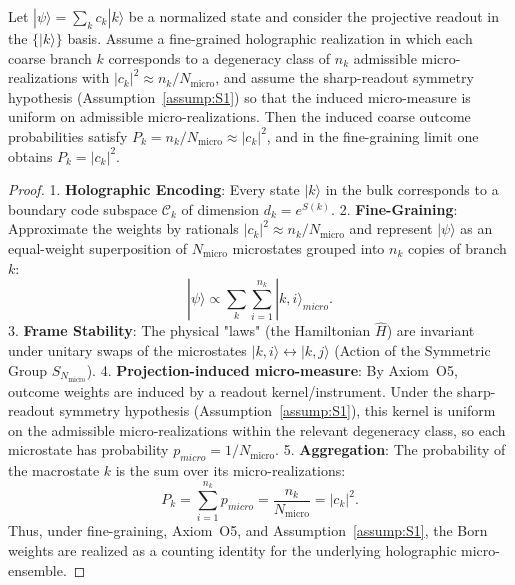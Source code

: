 \begin{theorem}
\label{thm:born_rule}
Let $|\psi\rangle = \sum_k c_k |k\rangle$ be a normalized state and consider the projective readout in the $\{|k\rangle\}$ basis. Assume a fine-grained holographic realization in which each coarse branch $k$ corresponds to a degeneracy class of $n_k$ admissible micro-realizations with $|c_k|^2\approx n_k/N_{\mathrm{micro}}$, and assume the sharp-readout symmetry hypothesis (Assumption~\ref{assump:S1}) so that the induced micro-measure is uniform on admissible micro-realizations. Then the induced coarse outcome probabilities satisfy $P_k=n_k/N_{\mathrm{micro}}\approx |c_k|^2$, and in the fine-graining limit one obtains $P_k=|c_k|^2$.
\end{theorem}
\begin{proof}
1. \textbf{Holographic Encoding}: Every state $|k\rangle$ in the bulk corresponds to a boundary code subspace $\mathcal{C}_k$ of dimension $d_k = e^{S(k)}$.
2. \textbf{Fine-Graining}: Approximate the weights by rationals $|c_k|^2 \approx n_k/N_{\mathrm{micro}}$ and represent $|\psi\rangle$ as an equal-weight superposition of $N_{\mathrm{micro}}$ microstates grouped into $n_k$ copies of branch $k$:
\begin{equation}
|\psi\rangle \propto \sum_{k} \sum_{i=1}^{n_k} |k, i\rangle_{micro}.
\end{equation}
3. \textbf{Frame Stability}: The physical "laws" (the Hamiltonian $\hat{H}$) are invariant under unitary swaps of the microstates $|k, i\rangle \leftrightarrow |k, j\rangle$ (Action of the Symmetric Group $S_{N_{\mathrm{micro}}}$).
4. \textbf{Projection-induced micro-measure}: By Axiom~O5, outcome weights are induced by a readout kernel/instrument. Under the sharp-readout symmetry hypothesis (Assumption~\ref{assump:S1}), this kernel is uniform on the admissible micro-realizations within the relevant degeneracy class, so each microstate has probability $p_{micro} = 1/N_{\mathrm{micro}}$.
5. \textbf{Aggregation}: The probability of the macrostate $k$ is the sum over its micro-realizations:
\begin{equation}
    P_k = \sum_{i=1}^{n_k} p_{micro} = \frac{n_k}{N_{\mathrm{micro}}} = |c_k|^2.
\end{equation}
Thus, under fine-graining, Axiom~O5, and Assumption~\ref{assump:S1}, the Born weights are realized as a counting identity for the underlying holographic micro-ensemble.
\end{proof}

